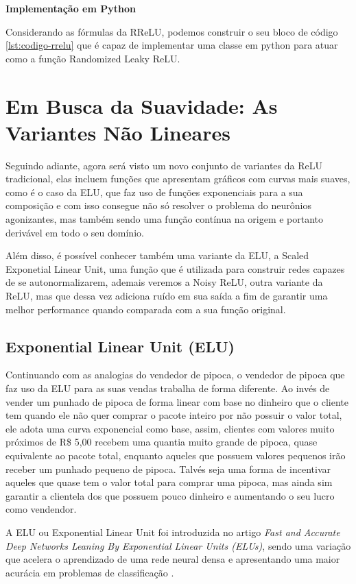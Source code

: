 \textbf{Implementação em Python}

Considerando as fórmulas da RReLU, podemos construir o seu bloco de código \ref{lst:codigo-rrelu} que é capaz de implementar uma classe em python para atuar como a função Randomized Leaky ReLU.

\section{Em Busca da Suavidade: As Variantes Não Lineares}

Seguindo adiante, agora será visto um novo conjunto de variantes da ReLU tradicional, elas incluem funções que apresentam gráficos com curvas mais suaves, como é o caso da ELU, que faz uso de funções exponenciais para a sua composição e com isso consegue não só resolver o problema do neurônios agonizantes, mas também sendo uma função contínua na origem e portanto derivável em todo o seu domínio.

Além disso, é possível conhecer também uma variante da ELU, a Scaled Exponetial Linear Unit, uma função que é utilizada para construir redes capazes de se autonormalizarem, ademais veremos a Noisy ReLU, outra variante da ReLU, mas que dessa vez adiciona ruído em sua saída a fim de garantir uma melhor performance quando comparada com a sua função original.

\subsection{Exponential Linear Unit (ELU)}

Continuando com as analogias do vendedor de pipoca, o vendedor de pipoca que faz uso da ELU para as suas vendas trabalha de forma diferente. Ao invés de vender um punhado de pipoca de forma linear com base no dinheiro que o cliente tem quando ele não quer comprar o pacote inteiro por não possuir o valor total, ele adota uma curva exponencial como base, assim, clientes com valores muito próximos de R\$ 5,00 recebem uma quantia muito grande de pipoca, quase equivalente ao pacote total, enquanto aqueles que possuem valores pequenos irão receber um punhado pequeno de pipoca. Talvés seja uma forma de incentivar aqueles que quase tem o valor total para comprar uma pipoca, mas ainda sim garantir a clientela dos que possuem pouco dinheiro e aumentando o seu lucro como vendendor.

A ELU ou Exponential Linear Unit foi introduzida no artigo \textit{Fast and Accurate Deep Networks Leaning By Exponential Linear Units (ELUs)}, sendo uma variação que acelera o aprendizado de uma rede neural densa e apresentando uma maior acurácia em problemas de classificação \parencite{ELUArticle}.

